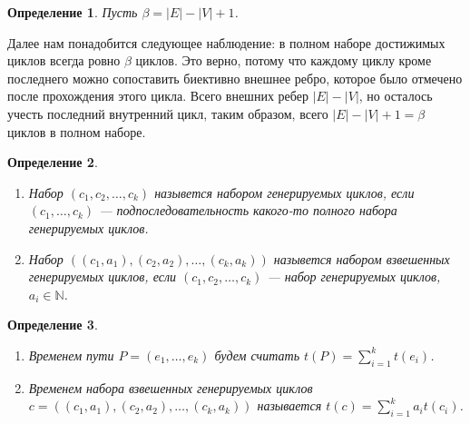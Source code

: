 \documentclass{article}
\newcommand{\squad}{
    \hspace{0.5em}
}
\newtheorem{corollary}{Предложение}
\newtheorem{definition}{Определение}
\begin{document}
\begin{definition}
    Пусть $\beta = |E| - |V| + 1$.
\end{definition}

Далее нам понадобится следующее наблюдение: в полном наборе достижимых циклов всегда ровно $\beta$ циклов. Это верно, потому что каждому циклу кроме последнего можно сопоставить биективно внешнее ребро, которое было отмечено после прохождения этого цикла. Всего внешних ребер $|E| - |V|$, но осталось учесть последний внутренний цикл, таким образом, всего $|E| - |V| + 1 = \beta$ циклов в полном наборе. 




\begin{definition} $ $
    \label{gen}
    \begin{enumerate}
        \item Набор $(c_{1}, c_{2}, \ldots, c_{k})$ назывется набором генерируемых циклов, если $(c_{1}, \ldots, c_{k})$ --- подпоследовательность какого-то полного набора генерируемых циклов.
        \item Набор $((c_{1}, a_{1}), (c_{2}, a_{2}), \ldots, (c_{k}, a_{k}))$ назывется набором взвешенных генерируемых циклов, если $(c_{1}, c_{2}, \ldots, c_{k})$ --- набор генерируемых циклов, $a_{i} \in \mathbb{N}$.
    \end{enumerate}
\end{definition}

\begin{definition} $ $
    \begin{enumerate}
        \item Временем пути $P = (e_{1}, \ldots, e_{k})$ будем считать $t(P) = \sum_{i = 1}^{k}{t(e_{i})}$.
        \item Временем набора взвешенных генерируемых циклов $c = ((c_{1}, a_{1}), (c_{2}, a_{2}), \ldots, (c_{k}, a_{k}))$ называется $t(c) = \sum_{i = 1}^{k}{a_{i}t(c_{i})}$.
    \end{enumerate} 
\end{definition}
\end{document}
